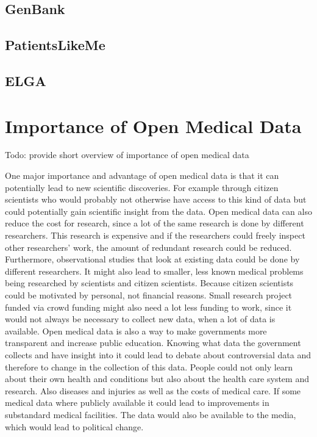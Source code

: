 \documentclass[a4paper, 11pt]{article}
\begin{document}
\subsection{GenBank}

\subsection{PatientsLikeMe}

\subsection{ELGA}

\section{Importance of Open Medical Data}\label{sec:importance}

Todo: provide short overview of importance of open medical data 

One major importance and advantage of open medical data is that it can potentially lead to new scientific discoveries. For example through citizen scientists who would probably not otherwise have access to this kind of data but could potentially gain scientific insight from the data. \cite{Hoffman2015}
Open medical data can also reduce the cost for research, since a lot of the same research is done by different researchers. This research is expensive and if the researchers could freely inspect other researchers' work, the amount of redundant research could be reduced. Furthermore, observational studies that look at existing data could be done by different researchers. It might also lead to smaller, less known medical problems being researched by scientists and citizen scientists. Because citizen scientists could be motivated by personal, not financial reasons. Small research project funded via crowd funding might also need a lot less funding to work, since it would not always be necessary to collect new data, when a lot of data is available. \cite{Hoffman2015}
Open medical data is also a way to make governments more transparent and increase public education. Knowing what data the government collects and have insight into it could lead to debate about controversial data and therefore to change in the collection of this data. People could not only learn about their own health and conditions but also about the health care system and research. Also diseases and injuries as well as the costs of medical care. If some medical data where publicly available it could lead to improvements in substandard medical facilities. The data would also be available to the media, which would lead to political change. \cite{Hoffman2015}
\end{document}
